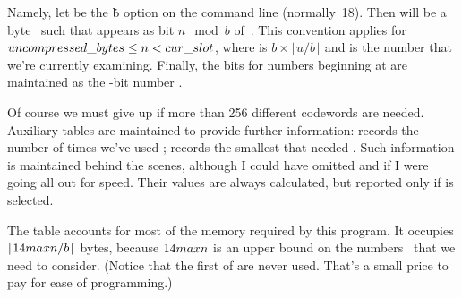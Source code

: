 Namely, let  be the \.b option on
the
command line (normally~18). Then  will be a byte~
such that  appears as bit $n\mod b$ of~.
This convention applies for $\PB{\\{uncompressed\_bytes}}\le n<\PB{\\{cur%
\_slot}}$,
where  is $b\times\lfloor u/b\rfloor$ and  is the
number
that we're currently examining. Finally, the  bits for
 numbers beginning at  are maintained as the
-bit number .

Of course we must give up if more than 256 different codewords are needed.
Auxiliary tables are maintained to provide further information:
 records the number of times we've used ;
 records the smallest  that needed
.
Such information is maintained behind the scenes, although I could
have omitted  and  if I were going all
out for
speed. Their values are always calculated, but
reported only if  is selected.

The  table accounts for most of the memory required by
this program. It occupies $\lceil 14\relax{\\{maxn}}/b\rceil$ bytes,
because $14\relax{\\{maxn}}$ is an upper bound on the numbers~ that
we need to consider. (Notice that the first 
of  are never used.
That's a small price to pay for ease of programming.)

